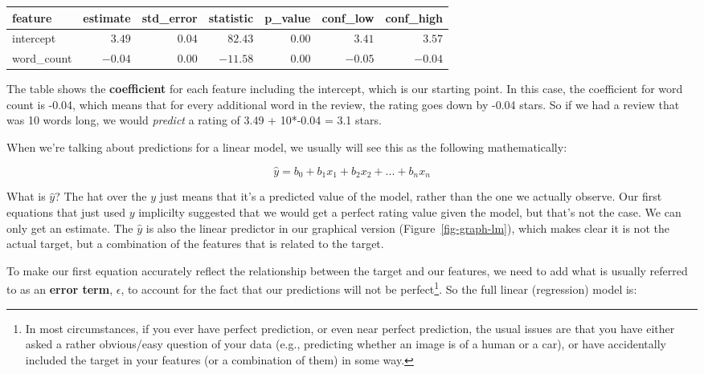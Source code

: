 \documentclass[
  letterpaper,
]{krantz}
\begin{document}
\small

\begin{longtable*}{lrrrrrr}
\toprule
feature & estimate & std\_error & statistic & p\_value & conf\_low & conf\_high \\ 
\midrule\addlinespace[2.5pt]
intercept & \textcolor[HTML]{404040}{$3.49$} & \textcolor[HTML]{404040}{$0.04$} & \textcolor[HTML]{404040}{$82.43$} & \textcolor[HTML]{404040}{$0.00$} & \textcolor[HTML]{404040}{$3.41$} & \textcolor[HTML]{404040}{$3.57$} \\ 
word\_count & \textcolor[HTML]{404040}{$-0.04$} & \textcolor[HTML]{404040}{$0.00$} & \textcolor[HTML]{404040}{$-11.58$} & \textcolor[HTML]{404040}{$0.00$} & \textcolor[HTML]{404040}{$-0.05$} & \textcolor[HTML]{404040}{$-0.04$} \\ 
\bottomrule
\end{longtable*}

\normalsize

The table shows the \textbf{coefficient} for each feature including the
intercept, which is our starting point. In this case, the coefficient
for word count is -0.04, which means that for every additional word in
the review, the rating goes down by -0.04 stars. So if we had a review
that was 10 words long, we would \emph{predict} a rating of 3.49 +
10*-0.04 = 3.1 stars.

When we're talking about predictions for a linear model, we usually will
see this as the following mathematically:

\[
\hat{y} = b_0 + b_1x_1 + b_2x_2 + ... + b_nx_n
\]

What is \(\hat{y}\)? The hat over the \(y\) just means that it's a
predicted value of the model, rather than the one we actually observe.
Our first equations that just used \(y\) implicilty suggested that we
would get a perfect rating value given the model, but that's not the
case. We can only get an estimate. The \(\hat{y}\) is also the linear
predictor in our graphical version (Figure~\ref{fig-graph-lm}), which
makes clear it is not the actual target, but a combination of the
features that is related to the target.

To make our first equation accurately reflect the relationship between
the target and our features, we need to add what is usually referred to
as an \textbf{error term}, \(\epsilon\), to account for the fact that
our predictions will not be perfect\footnote{In most circumstances, if
  you ever have perfect prediction, or even near perfect prediction, the
  usual issues are that you have either asked a rather obvious/easy
  question of your data (e.g., predicting whether an image is of a human
  or a car), or have accidentally included the target in your features
  (or a combination of them) in some way.}. So the full linear
(regression) model is:
\end{document}
